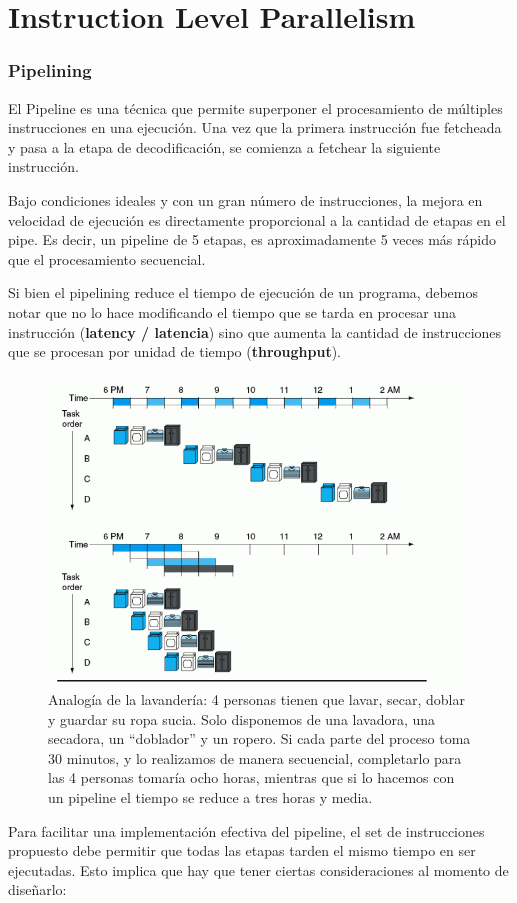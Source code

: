 \newpage
\part{Instruction Level Parallelism}
\section{Pipelining}
El Pipeline es una técnica que permite superponer el procesamiento de múltiples instrucciones en una ejecución. Una vez que la primera instrucción fue fetcheada y pasa a la etapa de decodificación, se comienza a fetchear la siguiente instrucción. 

Bajo condiciones ideales y con un gran número de instrucciones, la mejora en velocidad de ejecución es directamente proporcional a la cantidad de etapas en el pipe. Es decir, un pipeline de 5 etapas, es aproximadamente 5 veces más rápido que el procesamiento secuencial.  

Si bien el pipelining reduce el tiempo de ejecución de un programa, debemos notar que no lo hace modificando el tiempo que se tarda en procesar una instrucción (\textbf{latency / latencia}) sino que aumenta la cantidad de instrucciones que se procesan por unidad de tiempo (\textbf{throughput}).
\begin{figure}[h]
	\centering
	\includegraphics[width=0.5\linewidth]{imagenes/pipelining}
	\caption{Analogía de la lavandería: 4 personas tienen que lavar, secar, doblar y guardar su ropa sucia. Solo disponemos de una lavadora, una secadora, un ``doblador'' y un ropero. Si cada parte del proceso toma 30 minutos, y lo realizamos de manera secuencial, completarlo para las 4 personas tomaría ocho horas, mientras que si lo hacemos con un pipeline el tiempo se reduce a tres horas y media.}
	\label{fig:pipelining}
\end{figure}

Para facilitar una implementación efectiva del pipeline, el set de instrucciones propuesto debe permitir que todas las etapas tarden el mismo tiempo en ser ejecutadas. Esto implica que hay que tener ciertas consideraciones al momento de diseñarlo:

